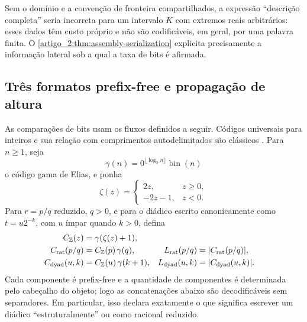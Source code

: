\begin{remark}\label{map:artigo_2:3.10}
Sem o domínio e a convenção de fronteira compartilhados, a expressão
``descrição completa'' seria incorreta para um intervalo $K$ com extremos
reais arbitrários: esses dados têm custo próprio e não são codificáveis, em
geral, por uma palavra finita. O \cref{artigo_2:thm:assembly-serialization} explicita
precisamente a informação lateral sob a qual a taxa de bits é afirmada.
\end{remark}

\subsection{Três formatos prefix-free e propagação de altura}
\label{artigo_2:subsec:coding-formats}

As comparações de bits usam os fluxos definidos a seguir. Códigos universais para inteiros e sua relação
com comprimentos autodelimitados são clássicos
\citep{artigo_1-elias1975,artigo_1-cover2006}. Para $n\ge1$, seja
\[
 \gamma(n)=0^{\lfloor\log_2n\rfloor}\operatorname{bin}(n)
\]
o código gama de Elias, e ponha
\[
 \zeta(z)=\begin{cases}2z,&z\ge0,\\-2z-1,&z<0.
 \end{cases}
\]
Para $r=p/q$ reduzido, $q>0$, e para o diádico escrito canonicamente como
$t=u2^{-k}$, com $u$ ímpar quando $k>0$, defina
\begin{align}
 C_{\mathbb Z}(z)&=\gamma(\zeta(z)+1),\\
 C_{\rm rat}(p/q)&=C_{\mathbb Z}(p)\,\gamma(q),
 &L_{\rm rat}(p/q)&=|C_{\rm rat}(p/q)|,\label{artigo_2:eq:rational-code}\\
 C_{\rm dyad}(u,k)&=C_{\mathbb Z}(u)\,\gamma(k+1),
 &L_{\rm dyad}(u,k)&=|C_{\rm dyad}(u,k)|.
 \label{artigo_2:eq:dyadic-code}
\end{align}
Cada componente é prefix-free e a quantidade de componentes é determinada
pelo cabeçalho do objeto; logo as concatenações abaixo são decodificáveis sem
separadores. Em particular, isso declara exatamente o que significa escrever
um diádico ``estruturalmente'' ou como racional reduzido.

